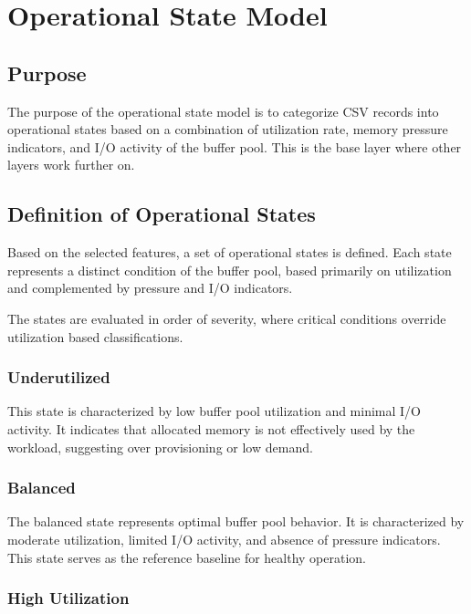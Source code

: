 \section{Operational State Model}

\subsection{Purpose}

The purpose of the operational state model is to categorize CSV records into operational states based on a combination of utilization rate, memory pressure indicators, and I/O activity of the buffer pool. This is the base layer where other layers work further on. 

\subsection{Definition of Operational States}

Based on the selected features, a set of operational states is defined. 
Each state represents a distinct condition of the buffer pool, based primarily on
utilization and complemented by pressure and I/O indicators.

The states are evaluated in order of severity, where critical conditions override 
utilization based classifications.

\subsubsection{Underutilized}

This state is characterized by low buffer pool utilization and minimal I/O activity. 
It indicates that allocated memory is not effectively used by the workload, suggesting 
over provisioning or low demand.

\subsubsection{Balanced}

The balanced state represents optimal buffer pool behavior. It is characterized by 
moderate utilization, limited I/O activity, and absence of pressure indicators. 
This state serves as the reference baseline for healthy operation.

\subsubsection{High Utilization}

